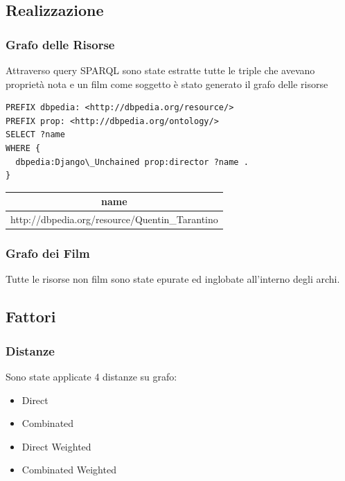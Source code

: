 \documentclass{beamer}
\begin{document}

\subsection{Realizzazione}


\begin{frame}
\frametitle{Grafo delle Risorse}
Attraverso query SPARQL sono state estratte tutte le triple che avevano proprietà nota e un film come soggetto
è stato generato il grafo delle risorse

\begin{verbatim}
PREFIX dbpedia: <http://dbpedia.org/resource/>
PREFIX prop: <http://dbpedia.org/ontology/>
SELECT ?name
WHERE {
  dbpedia:Django\_Unchained prop:director ?name .
}
\end{verbatim}

\begin{tabular}{|c|}
  \hline
  name \\
  \hline
  http://dbpedia.org/resource/Quentin\_Tarantino \\
  \hline
\end{tabular}
\end{frame}


\begin{frame}
\frametitle{Grafo dei Film}
Tutte le risorse non film sono state epurate ed inglobate all'interno degli archi.
\end{frame}


\subsection{Fattori}


\begin{frame}
\frametitle{Distanze}
Sono state applicate 4 distanze su grafo:

\begin{itemize}
\item Direct
\item Combinated
\item Direct Weighted
\item Combinated Weighted
\end{itemize}
\end{frame}
\end{document}
